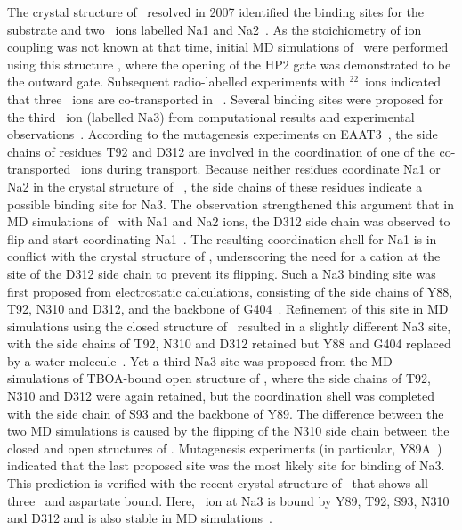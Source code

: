 The crystal structure of \GltPh\ resolved in 2007 identified the binding sites 
for the substrate and two \Na\ ions labelled Na1 and Na2~\cite{Boudker2007}. 
As the stoichiometry of ion coupling was not known at that time, initial MD 
simulations of \GltPh\ were performed using this structure 
\cite{Shrivastava2008,Huang2008}, where the opening of the HP2 gate was 
demonstrated to be the outward gate. Subsequent radio-labelled experiments with 
$^{22}$\Na\ ions indicated that three \Na\ ions are co-transported in 
\GltPh~\cite{Groeneveld2010}. Several binding sites were proposed for the 
third \Na\ ion (labelled Na3) from  computational results and experimental 
observations~\cite{Holley2009,Larsson2010,Tao2010,Huang2010,Bastug2012}. 
According to the mutagenesis experiments on EAAT3~\cite{Tao2010,Tao2006}, the 
side chains of residues T92 and D312 are involved in the coordination of one of 
the co-transported \Na\ ions during transport. Because neither residues 
coordinate Na1 or Na2 in the crystal structure of \GltPh~\cite{Boudker2007}, 
the side chains of these residues indicate a possible binding site for Na3. The 
observation strengthened this argument that in MD simulations of \GltPh\ 
with Na1 and Na2 ions, the D312 side chain was observed to flip and start 
coordinating Na1~\cite{Larsson2010,Bastug2012}. The resulting coordination 
shell for Na1 is in conflict with the crystal structure of \GltPh, underscoring 
the need for a cation at the site of the D312 side chain to prevent its flipping.  
Such a Na3 binding site was first proposed from electrostatic calculations, 
consisting of the side chains of Y88, T92, N310 and D312, and the backbone of 
G404~\cite{Tao2010}. Refinement of this site in MD simulations using the closed 
structure of \GltPh\ resulted in a slightly different Na3 site, with the side 
chains of T92, N310 and D312 retained but Y88 and G404 replaced by a water 
molecule~\cite{Huang2010}. Yet a third Na3 site was proposed from the MD 
simulations of TBOA-bound open structure of \GltPh, where the side chains of 
T92, N310 and D312 were again retained, but the coordination shell was completed 
with the side chain of S93 and the backbone of Y89. The difference between the 
two MD simulations is caused by the flipping of the N310 side chain between the 
closed and open structures of \GltPh. Mutagenesis experiments (in particular, 
Y89A~\cite{Bastug2012}) indicated that the last proposed site was the most 
likely site for binding of Na3. This prediction is verified with the recent 
crystal structure of \GltTk\ that shows all three \Na\ and aspartate bound. 
Here, \Na\ ion at Na3 is bound by Y89, T92, S93, N310 and D312 and is also 
stable in MD simulations~\cite{Guskov2016}.

